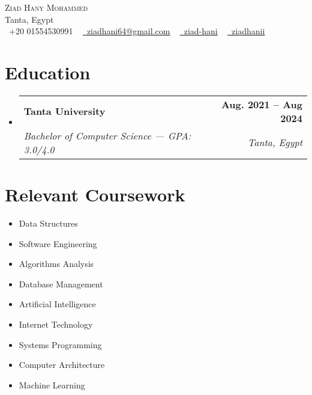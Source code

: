 \documentclass[letterpaper,11pt]{article}
\makeatletter
\newcommand{\resumeSubheading}[4]{
  \vspace{-2pt}\item
    \begin{tabular*}{1.0\textwidth}[t]{l@{\extracolsep{\fill}}r}
      \textbf{#1} & \textbf{\small #2} \\
      \textit{\small#3} & \textit{\small #4} \\
    \end{tabular*}\vspace{-7pt}
}
\newcommand{\resumeSubHeadingListStart}{\begin{itemize}[leftmargin=0.0in, label={}]}
\newcommand{\resumeSubHeadingListEnd}{\end{itemize}}
\makeatother
\begin{document}

\begin{center}
    {\Huge \scshape Ziad Hany Mohammed} \\ \vspace{1pt}
     Tanta, Egypt \\ \vspace{1pt}
    \small \raisebox{-0.1\height}\faPhone\ +20 01554530991 ~ \href{ziadhani64@gmail.com}{\raisebox{-0.2\height}\faEnvelope\  \underline{ziadhani64@gmail.com}} ~ 
    \href{https://www.linkedin.com/in/ziad-hani/}{\raisebox{-0.2\height}\faLinkedin\ \underline{ziad-hani}}  ~
    \href{https://github.com/ziadhanii}{\raisebox{-0.2\height}\faGithub\ \underline{ziadhanii}}
    \vspace{-8pt}
\end{center}


\section{Education}
  \resumeSubHeadingListStart
    \resumeSubheading
      {Tanta University}{Aug. 2021 -- Aug 2024}
      {Bachelor of Computer Science — GPA: 3.0/4.0}{Tanta, Egypt}
  \resumeSubHeadingListEnd

\section{Relevant Coursework}
        \begin{multicols}{3}
            \begin{itemize}[itemsep=-5pt, parsep=3pt]
                \item\small Data Structures
                \item Software Engineering
                \item Algorithms Analysis
                \item Database Management
                \item Artificial Intelligence
                \item Internet Technology
                \item Systems Programming
                \item Computer Architecture
                \item Machine Learning
            \end{itemize}
        \end{multicols}
        \vspace*{2.0\multicolsep}
\end{document}
